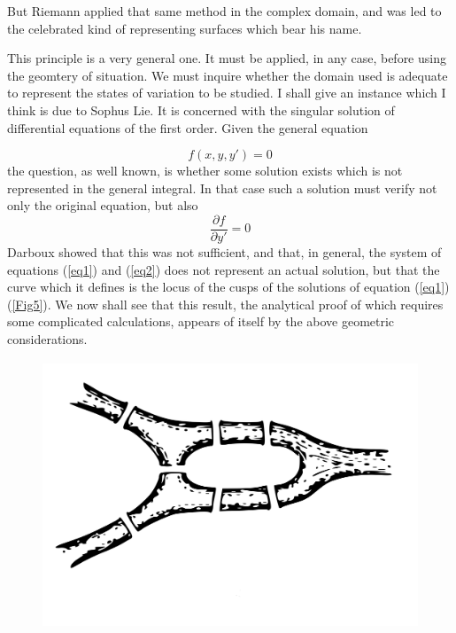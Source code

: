 \documentclass[12pt,oneside]{book}
\begin{document}
But Riemann applied that same method in the complex domain, and was led to the celebrated kind of representing surfaces which bear his name. \par 

This principle is a very general one. It must be applied, in any case, before using the geomtery of situation. We must inquire whether the domain used is adequate to represent the states of variation to be studied. I shall give an instance which I think is due to Sophus Lie. It is concerned with the singular solution of differential equations of the first order. Given the general equation 

\begin{equation}
    f(x,y,y')=0
    \label{eq1}
\end{equation}
the question, as well known, is whether some solution exists which is not represented in the general integral. In that case such a solution must verify not only the original equation, but also 
\begin{equation}
    \frac{\partial f}{\partial y'}=0
    \label{eq2}
\end{equation}
Darboux showed that this was not sufficient, and that, in general, the system of equations (\ref{eq1}) and (\ref{eq2}) does not represent an actual solution, but that the curve which it defines is the locus of the cusps of the solutions of equation (\ref{eq1}) (\ref{Fig5}). We now shall see that this result, the analytical proof of which requires some complicated calculations, appears of itself by the above geometric considerations. \par 

\begin{figure}
    \centering
    \includegraphics[height=8cm]{Fig4.jpeg}
    \caption[]{}
    \label{Fig4}
\end{figure}
\end{document}
